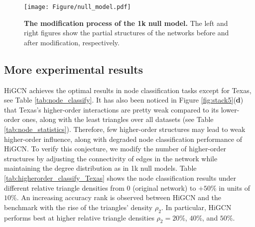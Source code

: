 \documentclass[letterpaper]{article} \usepackage{aaai24}
\theoremstyle{plain}
\theoremstyle{definition}
\theoremstyle{remark}
\begin{document}
\begin{figure}[h]
\centering
\texttt{[image: Figure/null\_model.pdf]}
\caption{\textbf{The modification process of the 1k null model.} The left and right figures show the partial structures of the networks before and after modification, respectively.}
\label{fig:1knull}
\end{figure}












\subsection{More experimental results}
\label{appendix: more_exp}

HiGCN achieves the optimal results in node classification tasks except for Texas, see Table \ref{tab:node_classify}.
It has also been noticed in Figure \ref{fig:stack5}(\textbf{d}) that Texas's higher-order interactions are pretty weak compared to its lower-order ones, along with the least triangles over all datasets (see Table \ref{tab:node_statistics}).
Therefore, few higher-order structures may lead to weak higher-order influence, along with degraded node classification performance of HiGCN. 
To verify this conjecture, we modify the number of higher-order structures by adjusting the connectivity of edges in the network while maintaining the degree distribution as in 1k null models.
Table \ref{tab:higherorder_classify_Texas} shows the node classification results under different relative triangle densities from 0 (original network) to $+ 50 \%$ in units of $10 \%$.
An increasing accuracy rank is observed between HiGCN and the benchmark with the rise of the triangles' density $\rho_2$.
In particular, HiGCN performs best at higher relative triangle densities $\rho_2 = 20 \%$, $40 \%$, and $50 \%$.
\end{document}
